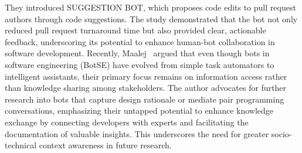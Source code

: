 They introduced SUGGESTION BOT, which proposes code edits to pull request authors through code suggestions.
The study demonstrated that the bot not only reduced pull request turnaround time but also provided clear, actionable feedback, underscoring its potential to enhance human-bot collaboration in software development.
Recently, Maalej~\cite{maalej2023rsse} argued that even though bots in software engineering (BotSE) have evolved from simple task automators to intelligent assistants, their primary focus remains on information access rather than knowledge sharing among stakeholders. 
The author advocates for further research into bots that capture design rationale or mediate pair programming conversations, emphasizing their untapped potential to enhance knowledge exchange by connecting developers with experts and facilitating the documentation of valuable insights. 
This underscores the need for greater socio-technical context awareness in future research.